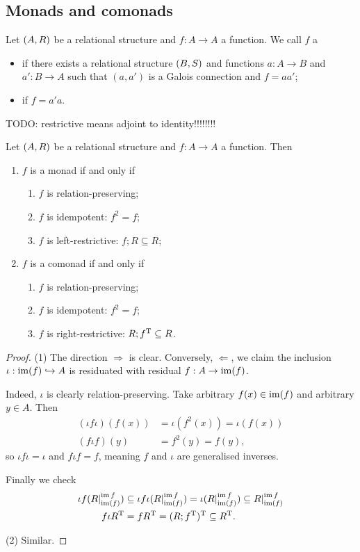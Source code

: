 \subsection{Monads and comonads}
\begin{definition}
Let $\sSet{A,R}$ be a relational structure and $f: A\to A$ a function. We call $f$ a
\begin{itemize}
\item {} if there exists a relational structure $\sSet{B,S}$ and functions $a: A\to B$ and $a': B\to A$ such that $(a, a')$ is a Galois connection and $f = aa'$;
\item {} if $f = a'a$.
\end{itemize}
\end{definition}

TODO: restrictive means adjoint to identity!!!!!!!!

\begin{lemma}
Let $\sSet{A,R}$ be a relational structure and $f: A \to A$ a function. Then
\begin{enumerate}
\item $f$ is a monad \textup{if and only if}
\begin{enumerate}
\item $f$ is relation-preserving;
\item $f$ is idempotent: $f^2 = f$;
\item $f$ is left-restrictive: $f;R \subseteq R$;
\end{enumerate}
\item $f$ is a comonad \textup{if and only if}
\begin{enumerate}
\item $f$ is relation-preserving;
\item $f$ is idempotent: $f^2 = f$;
\item $f$ is right-restrictive: $R;f^{\mathrm{T}} \subseteq R$.
\end{enumerate}
\end{enumerate}
\end{lemma}
\begin{proof}
(1) The direction $\Rightarrow$ is clear. Conversely, $\Leftarrow$, we claim the inclusion $\iota: \operatorname{im}(f) \hookrightarrow A$ is residuated with residual $f: A\to \operatorname{im}(f)$.

Indeed, $\iota$ is clearly relation-preserving. Take arbitrary $f(x)\in \operatorname{im}(f)$ and arbitrary $y\in A$. Then 
\begin{align*}
(\iota f \iota)(f(x)) &= \iota(f^2(x)) = \iota(f(x)) \\
(f \iota f)(y) &= f^2(y) = f(y),
\end{align*}
so $\iota f \iota = \iota$ and $f\iota f = f$, meaning $f$ and $\iota$ are generalised inverses.

Finally we check
\begin{align*}
\iota f (R|^{\operatorname{im} f}_{\operatorname{im}(f)}) &\subseteq \iota f \iota (R|^{\operatorname{im} f}_{\operatorname{im}(f)}) = \iota (R|^{\operatorname{im} f}_{\operatorname{im}(f)}) \subseteq R|^{\operatorname{im} f}_{\operatorname{im}(f)} \\
f \iota R^{\mathrm{T}} &= f R^{\mathrm{T}} = (R;f^{\mathrm{T}})^{\mathrm{T}} \subseteq R^{\mathrm{T}}.
\end{align*}

(2) Similar.
\end{proof}

